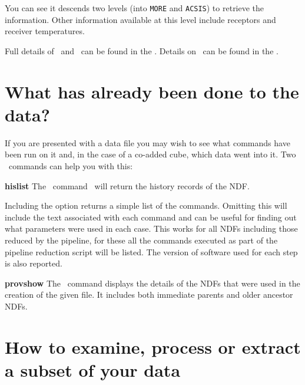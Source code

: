 \documentclass[11pt,oneside,chapters]{starlink}
\begin{document}
You can see it descends two levels (into \texttt{MORE} and
\texttt{ACSIS}) to retrieve the information. Other information
available at this level include receptors and receiver temperatures.

Full details of \ndftrace\ and \fitslist\ can be found in the
. Details on \HDSTRACE\ can be
found in the .



\section{What has already been done to the data?}

If you are presented with a data file you may wish to see what
commands have been run on it and, in the case of a co-added cube, which
data went into it. Two \Kappa\ commands can help you with this:
\vspace{0.7cm}\\
\begin{aligndesc}
\item[\textbf{hislist}]
The \Kappa\ command \hislist\ will return the history records of the NDF.
\begin{terminalv}
\end{terminalv}
Including the  option returns a simple list of the
commands. Omitting this will include the text associated with each
command and can be useful for finding out what parameters were used in
each case. This works for all NDFs including those reduced by the
pipeline, for these all the commands executed as part of the pipeline
reduction script will be listed. The version of software used for each
step is also reported.

\item[\textbf{provshow}]
The \Kappa\ command  displays the details of the NDFs
that were used in the creation of the given file. It includes both
immediate parents and older ancestor NDFs.
\begin{terminalv}
\end{terminalv}
\end{aligndesc}

\section{How to examine, process or extract a subset of your data}
\label{sec:ndfsections}
\end{document}
